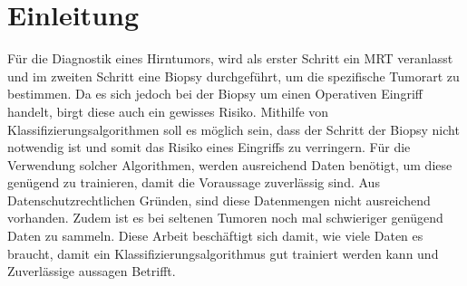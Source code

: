 \chapter{Einleitung}

Für die Diagnostik eines Hirntumors, wird als erster Schritt ein MRT veranlasst und im zweiten Schritt eine Biopsy 
durchgeführt, um die spezifische Tumorart zu bestimmen.
Da es sich jedoch bei der Biopsy um einen Operativen Eingriff handelt, birgt diese auch ein gewisses Risiko.
Mithilfe von Klassifizierungsalgorithmen soll es möglich sein, dass der Schritt der Biopsy nicht notwendig ist 
und somit das Risiko eines Eingriffs  zu verringern.
Für die Verwendung solcher Algorithmen, werden ausreichend Daten benötigt, um diese genügend zu trainieren, damit die 
Voraussage zuverlässig sind. 
Aus Datenschutzrechtlichen Gründen, sind diese Datenmengen nicht ausreichend vorhanden. Zudem ist es bei seltenen
Tumoren noch mal schwieriger genügend Daten zu sammeln.
Diese Arbeit beschäftigt sich damit, wie viele Daten es braucht, damit ein Klassifizierungsalgorithmus gut trainiert werden
kann und Zuverlässige aussagen Betrifft. 


